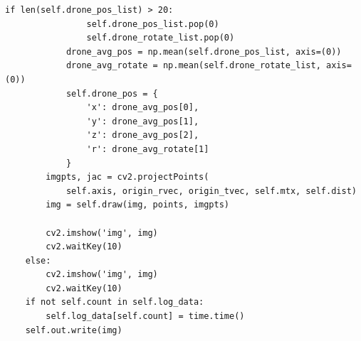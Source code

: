 \begin{lstlisting}[caption=pnp method,label=src_pnp]
            if len(self.drone_pos_list) > 20:                                                                                                                
                self.drone_pos_list.pop(0)                                                                                                                   
                self.drone_rotate_list.pop(0)                                                                                                                
            drone_avg_pos = np.mean(self.drone_pos_list, axis=(0))                                                                                           
            drone_avg_rotate = np.mean(self.drone_rotate_list, axis=(0))                                                                                     
            self.drone_pos = {                                                                                                                               
                'x': drone_avg_pos[0],                                                                                                                       
                'y': drone_avg_pos[1],                                      
                'z': drone_avg_pos[2],                                      
                'r': drone_avg_rotate[1]                                    
            }                                                               
        imgpts, jac = cv2.projectPoints(                                    
            self.axis, origin_rvec, origin_tvec, self.mtx, self.dist)       
        img = self.draw(img, points, imgpts)                                
                                                                            
        cv2.imshow('img', img)                                              
        cv2.waitKey(10)                                                     
    else:                                                                   
        cv2.imshow('img', img)                                              
        cv2.waitKey(10)                                                     
    if not self.count in self.log_data:                                     
        self.log_data[self.count] = time.time()                             
    self.out.write(img)    
\end{lstlisting}
